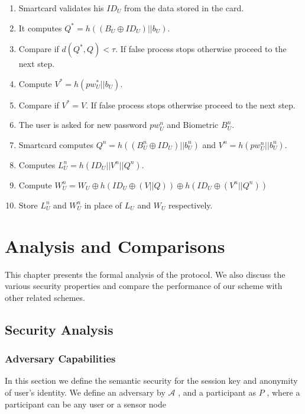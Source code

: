 \documentclass[a4paper,12pt]{report}
\begin{document}
\begin{enumerate}
\item Smartcard validates his $ID_U$ from the data stored in the card.
\item It computes $Q^{*} = h((B_{U} \oplus ID_{U})||b_U)$.
\item Compare if $d(Q^{*},Q)< \tau$. If false process stops otherwise proceed to the next step.
\item Compute $V^{*}=h(pw_{U}^{*} || b_{U})$.
\item Compare if $V^{*} = V$. If false process stops otherwise proceed to the next step.
\item The user is asked for new password $pw_{U}^{n}$ and Biometric $B_{U}^{n}$.
\item Smartcard computes $Q^{n} =  h((B_{U}^{n} \oplus ID_{U})|| b_{U}^{n})$  and $V^{n}=h(pw_{U}^{n} ||b_{U}^{n})$.
\item Computes $L_{U}^{n} = h(ID_{U}||V^{n}||Q^{n})$.
\item Compute $W_{U}^{n}= W_{U} \oplus  h(ID_{U} \oplus (V || Q)) \oplus h(ID_{U} \oplus (V^{n} || Q^{n}))$
\item Store $L_{U}^{n}$ and $W_{U}^{n}$ in place of $L_U$ and $W_U$ respectively.
\end{enumerate}


\afterpage{\null\newpage}
\chapter{Analysis and Comparisons}
\label{Ch5} This chapter presents the formal analysis of the
protocol. We also discuss the various security properties and
compare the performance of our scheme with other related schemes.
\medskip


\section{Security Analysis}
\subsection{Adversary Capabilities}
In this section we define the semantic security for the session key and anonymity of user's identity. We define an adversary by $\mathcal{A}$ , and a participant as $P$ , where a participant can be any user or a sensor node\\
\end{document}
